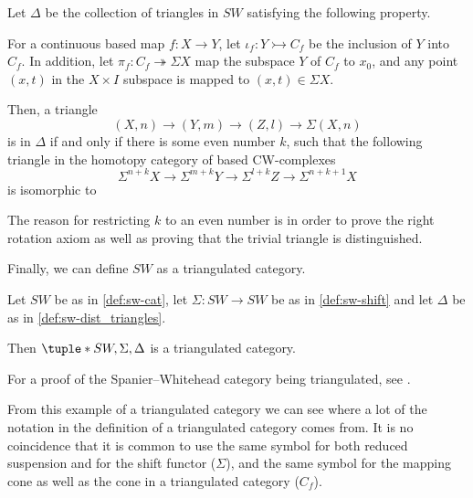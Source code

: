 \begin{definition}
    \label{def:sw-dist_triangles}
    Let \( \Delta \) be the collection of triangles in \( SW \) satisfying the following property.

    For a continuous based map \( f: X \to Y \), let \( \iota_f: Y \rightarrowtail C_f \) be the inclusion of \( Y \) into \( C_f \). In addition, let \( \pi_f: C_f \twoheadrightarrow \Sigma X \) map the subspace \( Y \) of \( C_f \) to \( x_0 \), and any point \( (x, t) \) in the \( X \times I \) subspace is mapped to \( (x, t) \in \Sigma X \).
    
    Then, a triangle
    \[
        (X, n) \to (Y, m) \to (Z, l) \to \Sigma (X, n)
    \]
    is in \( \Delta \) if and only if there is some even number \( k \), such that the following triangle in the homotopy category of based CW-complexes
    \[
        \Sigma^{n + k} X \to \Sigma^{m + k} Y \to \Sigma^{l + k} Z \to \Sigma^{n + k + 1} X
    \]
    is isomorphic to
    \begin{center}
    \end{center}
\end{definition}

The reason for restricting \( k \) to an even number is in order to prove the right rotation axiom as well as proving that the trivial triangle is distinguished.

Finally, we can define \( SW \) as a triangulated category.

\begin{example}
    Let \( SW \) be as in \autoref{def:sw-cat}, let \( \Sigma: SW \to SW \) be as in \autoref{def:sw-shift} and let \( \Delta \) be as in \autoref{def:sw-dist_triangles}.

    Then \( \tuple*{SW, \Sigma, \Delta} \) is a triangulated category.
\end{example}

For a proof of the Spanier--Whitehead category being triangulated, see \cite[Theorem 5.9]{Daria_Bachelor}.

From this example of a triangulated category we can see where a lot of the notation in the definition of a triangulated category comes from. It is no coincidence that it is common to use the same symbol for both reduced suspension and for the shift functor (\( \Sigma \)), and the same symbol for the mapping cone as well as the cone in a triangulated category (\( C_f \)).
